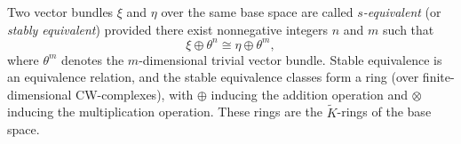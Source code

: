 Two vector bundles $\xi$ and $\eta$ over the same base space are called \textit{$s$-equivalent} (or \textit{stably equivalent}) provided there exist nonnegative integers $n$ and $m$ such that
$$\xi \oplus \theta^n \cong \eta \oplus \theta^m,$$
where $\theta^m$ denotes the $m$-dimensional trivial vector bundle. Stable equivalence is an equivalence relation, and the stable equivalence classes form a ring (over finite-dimensional CW-complexes), with $\oplus$ inducing the addition operation and $\otimes$ inducing the multiplication operation. These rings are the $\tilde{K}$-rings of the base space.
